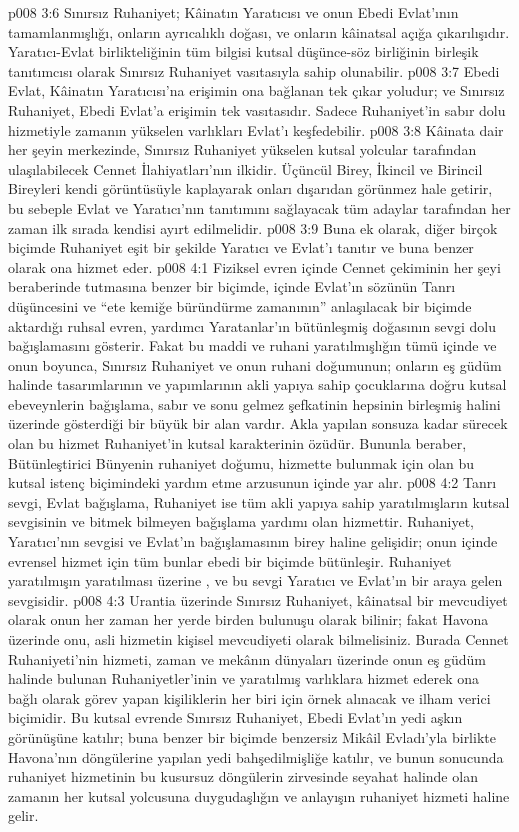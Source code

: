 \vs p008 3:6 Sınırsız Ruhaniyet; Kâinatın Yaratıcısı ve onun Ebedi Evlat’ının tamamlanmışlığı, onların ayrıcalıklı doğası, ve onların kâinatsal açığa çıkarılışıdır. Yaratıcı\hyp{}Evlat birlikteliğinin tüm bilgisi kutsal düşünce\hyp{}söz birliğinin birleşik tanıtımcısı olarak Sınırsız Ruhaniyet vasıtasıyla sahip olunabilir.
\vs p008 3:7 Ebedi Evlat, Kâinatın Yaratıcısı’na erişimin ona bağlanan tek çıkar yoludur; ve Sınırsız Ruhaniyet, Ebedi Evlat’a erişimin tek vasıtasıdır. Sadece Ruhaniyet’in sabır dolu hizmetiyle zamanın yükselen varlıkları Evlat’ı keşfedebilir.
\vs p008 3:8 Kâinata dair her şeyin merkezinde, Sınırsız Ruhaniyet yükselen kutsal yolcular tarafından ulaşılabilecek Cennet İlahiyatları’nın ilkidir. Üçüncül Birey, İkincil ve Birincil Bireyleri kendi görüntüsüyle kaplayarak onları dışarıdan görünmez hale getirir, bu sebeple Evlat ve Yaratıcı’nın tanıtımını sağlayacak tüm adaylar tarafından her zaman ilk sırada kendisi ayırt edilmelidir.
\vs p008 3:9 Buna ek olarak, diğer birçok biçimde Ruhaniyet eşit bir şekilde Yaratıcı ve Evlat’ı tanıtır ve buna benzer olarak ona hizmet eder.
\vs p008 4:1 Fiziksel evren içinde Cennet çekiminin her şeyi beraberinde tutmasına benzer bir biçimde, içinde Evlat’ın sözünün Tanrı düşüncesini ve “ete kemiğe büründürme zamanının” anlaşılacak bir biçimde aktardığı ruhsal evren, yardımcı Yaratanlar’ın bütünleşmiş doğasının sevgi dolu bağışlamasını gösterir. Fakat bu maddi ve ruhani yaratılmışlığın tümü içinde ve onun boyunca, Sınırsız Ruhaniyet ve onun ruhani doğumunun; onların eş güdüm halinde tasarımlarının ve yapımlarının akli yapıya sahip çocuklarına doğru kutsal ebeveynlerin bağışlama, sabır ve sonu gelmez şefkatinin hepsinin birleşmiş halini üzerinde gösterdiği bir büyük bir alan vardır. Akla yapılan sonsuza kadar sürecek olan bu hizmet Ruhaniyet’in kutsal karakterinin özüdür. Bununla beraber, Bütünleştirici Bünyenin ruhaniyet doğumu, hizmette bulunmak için olan bu kutsal istenç biçimindeki yardım etme arzusunun içinde yar alır.
\vs p008 4:2 Tanrı sevgi, Evlat bağışlama, Ruhaniyet ise tüm akli yapıya sahip yaratılmışların kutsal sevgisinin ve bitmek bilmeyen bağışlama yardımı olan hizmettir. Ruhaniyet, Yaratıcı’nın sevgisi ve Evlat’ın bağışlamasının birey haline gelişidir; onun içinde evrensel hizmet için tüm bunlar ebedi bir biçimde bütünleşir. Ruhaniyet yaratılmışın yaratılması üzerine , ve bu sevgi Yaratıcı ve Evlat’ın bir araya gelen sevgisidir.
\vs p008 4:3 Urantia üzerinde Sınırsız Ruhaniyet, kâinatsal bir mevcudiyet olarak onun her zaman her yerde birden bulunuşu olarak bilinir; fakat Havona üzerinde onu, asli hizmetin kişisel mevcudiyeti olarak bilmelisiniz. Burada Cennet Ruhaniyeti’nin hizmeti, zaman ve mekânın dünyaları üzerinde onun eş güdüm halinde bulunan Ruhaniyetler’inin ve yaratılmış varlıklara hizmet ederek ona bağlı olarak görev yapan kişiliklerin her biri için örnek alınacak ve ilham verici biçimidir. Bu kutsal evrende Sınırsız Ruhaniyet, Ebedi Evlat’ın yedi aşkın görünüşüne katılır; buna benzer bir biçimde benzersiz Mikâil Evladı’yla birlikte Havona’nın döngülerine yapılan yedi bahşedilmişliğe katılır, ve bunun sonucunda ruhaniyet hizmetinin bu kusursuz döngülerin zirvesinde seyahat halinde olan zamanın her kutsal yolcusuna duygudaşlığın ve anlayışın ruhaniyet hizmeti haline gelir.
